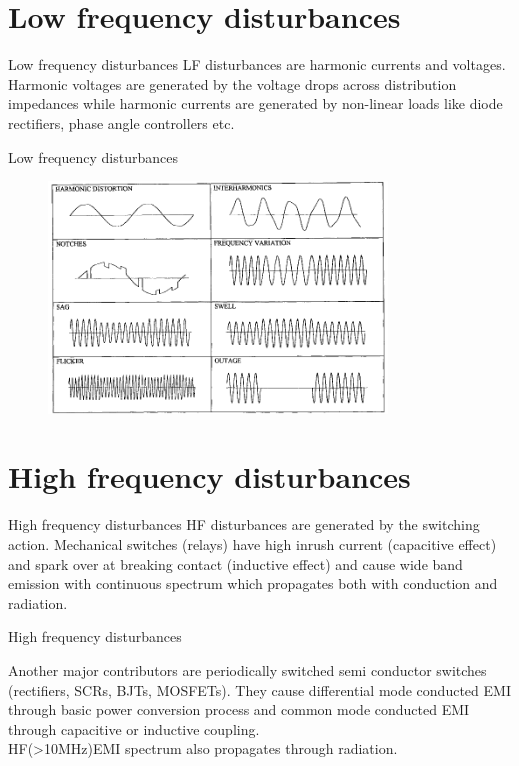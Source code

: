 \documentclass{beamer}
\begin{document}
\section{Low frequency disturbances} 
\begin{frame}{Low frequency disturbances}
LF disturbances are harmonic currents and voltages. Harmonic voltages are generated by the voltage drops across distribution impedances while harmonic currents are generated by non-linear loads like diode rectifiers, phase angle controllers etc. 
\end{frame}

\begin{frame}{Low frequency disturbances}
	\begin{figure}[ht!]
	\includegraphics[width=90mm]{FIG_6.png}
	\end{figure}
\end{frame}

\section{High frequency disturbances} 
\begin{frame}{High frequency disturbances}
HF disturbances are generated by the switching action. Mechanical switches (relays) have high inrush current (capacitive effect) and spark over at breaking contact (inductive effect) and cause wide band emission with continuous spectrum which propagates both with conduction and radiation.
\end{frame}

\begin{frame}{High frequency disturbances}

Another major contributors are periodically switched semi conductor switches (rectifiers, SCRs, BJTs, MOSFETs). They cause differential mode conducted EMI through basic power conversion process and common mode conducted EMI through capacitive or inductive coupling.\\

HF(\textgreater10MHz)EMI spectrum also propagates through radiation.  
\end{frame}
\end{document}
